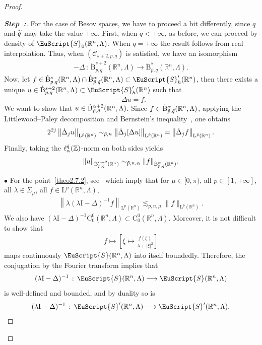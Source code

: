 \documentclass[10pt]{amsart}
\theoremstyle{definition}\newtheorem{defi}[theo]{Definition}\newtheorem{rema}[theo]{Remark}\newtheorem{exam}[theo]{Example}\newtheorem{exem}[theo]{Example}\newtheorem{nota}[theo]{Notation}
\newcommand{\bbR}{\mathbb{R}}
\newcommand{\bbZ}{\mathbb{Z}}
\newcommand{\rmB}{\mathrm{B}}
\newcommand{\rmL}{\mathrm{L}}
\newcommand{\rmC}{\mathrm{C}}
\newcommand{\rmI}{\mathrm{I}}
\newcommand{\clC}{\mathcal{C}}
\newcommand{\eus}{\EuScript}
\newcounter{stepcount}
\newenvironment{step}{\refstepcounter{stepcount}\begin{proof}[\textbf{Step~\thestepcount:}]}{\let\qed\relax\end{proof}}
\let\oldtilde\tilde
\renewcommand*{\tilde}[1]{\mathchoice{\widetilde{#1}}{\widetilde{#1}}{\oldtilde{#1}}{\oldtilde{#1}}}
\begin{document}
\begin{proof}
\begin{step}
For the case of Besov spaces, we have to proceed a bit differently, since $q$ and $\tilde{q}$ may take the value $+\infty$. First, when $q<+\infty$, as before, we can proceed by density of $\eus{S}_0(\bbR^n,\Lambda)$. When $q=+\infty$ the result follows from real interpolation. Thus, when $(\clC_{s+2,p,q})$ is satisfied, we have an isomorphism
\begin{align*}
-\Delta\,:\,\dot{\rmB}^{s+2}_{p,q}(\bbR^n,\Lambda)\longrightarrow\dot{\rmB}^{s}_{p,q}(\bbR^n,\Lambda).
\end{align*}
Now, let $f\in\dot{\rmB}^{s}_{p,q}(\bbR^n,\Lambda)\cap \dot{\rmB}^{\alpha}_{\tilde{p},\tilde{q}}(\bbR^n,\Lambda)\subset \eus{S}'_h(\bbR^n)$, then there exists a unique $u\in\dot{\rmB}^{s+2}_{p,q}(\bbR^n,\Lambda)\subset \eus{S}'_h(\bbR^n)$ such that
\begin{align*}
-\Delta u = f.
\end{align*}
We want to show that $u\in \dot{\rmB}^{\alpha+2}_{\tilde{p},\tilde{q}}(\bbR^n,\Lambda)$. Since $f\in \dot{\rmB}^{\alpha}_{\tilde{p},\tilde{q}}(\bbR^n,\Lambda)$, applying the Littlewood--Paley decomposition and Bernstein's inequality~\cite[Lemma~2.1]{bookBahouriCheminDanchin}, one obtains
\begin{align*}
2^{2j}\left\| \dot{\Delta}_j u\right\|_{\rmL^{\tilde{p}}(\bbR^n)}\sim_{\tilde{p},n} \left\| \dot{\Delta}_j [\Delta u]\right\|_{\rmL^{\tilde{p}}(\bbR^n)} = \left\| \dot{\Delta}_j f\right\|_{\rmL^{\tilde{p}}(\bbR^n)}.
\end{align*}
Finally, taking the $\ell_{\alpha}^{\tilde{q}}(\bbZ)$-norm on both sides yields
\begin{align*}
\| u\|_{\dot{\rmB}^{\alpha+2}_{\tilde{p},\tilde{q}}(\bbR^n)} \sim_{\tilde{p},n,\alpha} \| f\|_{\dot{\rmB}^{\alpha}_{\tilde{p},\tilde{q}}(\bbR^n)}.
\end{align*}

$\bullet$ For the point~\eqref{theo2.7.2}, see~\cite[Example~3.7.6,~Theorem~3.7.11]{ArendtBattyHieberNeubranker2011} which imply that for $\mu\in[0,\pi)$, all $p\in[1,+\infty]$, all $\lambda\in\Sigma_\mu$, all $f\in\rmL^p(\bbR^n,\Lambda)$,
\begin{align*}
\left\| \lambda (\lambda\rmI -\Delta)^{-1}f\right\|_{\rmL^p(\bbR^n)}\lesssim_{p,n,\mu} \| f\|_{\rmL^p(\bbR^n)}.
\end{align*}
We also have $(\lambda\rmI -\Delta)^{-1}\rmC^0_0(\bbR^n,\Lambda)\subset\rmC^0_0(\bbR^n,\Lambda)$. Moreover, it is not difficult to show that
\begin{align*}
f\longmapsto \left[\xi\mapsto \frac{f(\xi)}{\lambda+|\xi|^2}\right]
\end{align*}
maps continuously $\eus{S}(\bbR^n,\Lambda)$ into itself boundedly. Therefore, the conjugation by the Fourier transform implies that
\begin{align*}
(\lambda\rmI -\Delta)^{-1}\,:\,\eus{S}(\bbR^n,\Lambda)\longrightarrow \eus{S}(\bbR^n,\Lambda)
\end{align*}
is well-defined and bounded, and by duality so is
\begin{align*}
(\lambda\rmI -\Delta)^{-1}\,:\,\eus{S}'(\bbR^n,\Lambda)\longrightarrow \eus{S}'(\bbR^n,\Lambda).
\end{align*}


\end{step}
\end{proof}
\end{document}
